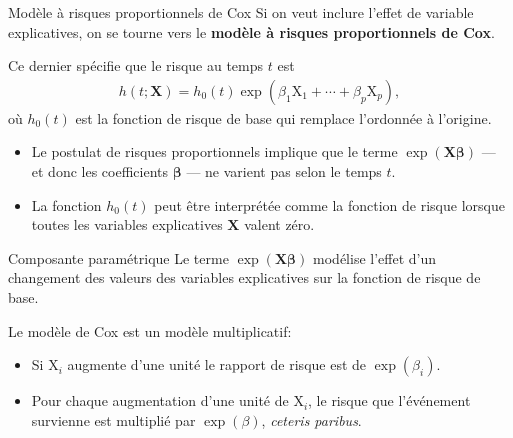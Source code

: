 \documentclass[
  ignorenonframetext,
]{beamer}
\providecommand{\tightlist}{%
  \setlength{\itemsep}{0pt}\setlength{\parskip}{0pt}}
\begin{document}
\begin{frame}{Modèle à risques proportionnels de Cox}
\protect{}\label{moduxe8le-uxe0-risques-proportionnels-de-cox}
Si on veut inclure l'effet de variable explicatives, on se tourne vers
le \textbf{modèle à risques proportionnels de Cox}.

Ce dernier spécifie que le risque au temps \(t\) est \begin{align*}
h(t; \mathbf{X}) = h_0(t)\exp(\beta_1\mathrm{X}_1 + \cdots + \beta_p \mathrm{X}_p),
\end{align*} où \(h_0(t)\) est la fonction de risque de base qui
remplace l'ordonnée à l'origine.

\begin{itemize}
\tightlist
\item
  Le postulat de risques proportionnels implique que le terme
  \(\exp(\mathbf{X}\boldsymbol{\beta})\) --- et donc les coefficients
  \(\boldsymbol{\beta}\) --- ne varient pas selon le temps \(t\).
\item
  La fonction \(h_0(t)\) peut être interprétée comme la fonction de
  risque lorsque toutes les variables explicatives \(\mathbf{X}\) valent
  zéro.
\end{itemize}
\end{frame}

\begin{frame}{Composante paramétrique}
\protect{}\label{composante-paramuxe9trique}
Le terme \(\exp(\mathbf{X}\boldsymbol{\beta})\) modélise l'effet d'un
changement des valeurs des variables explicatives sur la fonction de
risque de base.

Le modèle de Cox est un modèle multiplicatif:

\begin{itemize}
\tightlist
\item
  Si \(\mathrm{X}_i\) augmente d'une unité le rapport de risque est de
  \(\exp(\beta_i)\).
\item
  Pour chaque augmentation d'une unité de \(\mathrm{X}_i\), le risque
  que l'événement survienne est multiplié par \(\exp(\beta)\),
  \emph{ceteris paribus}.
\end{itemize}
\end{frame}
\end{document}
